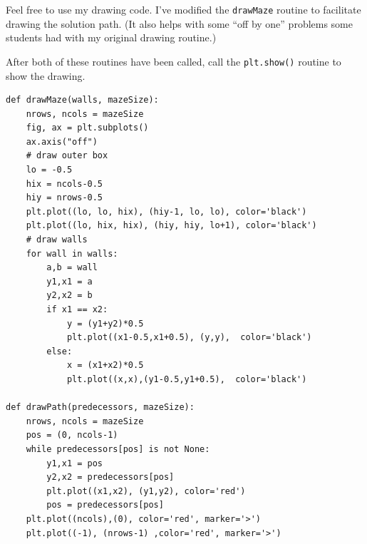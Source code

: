 \documentclass{article}
\begin{document}
\begin{description}
Feel free to use my drawing code.  I've modified the {\tt drawMaze}
routine to facilitate drawing the solution path.  (It also helps with
some ``off by one'' problems some students had with my original
drawing routine.)  

After both of these routines have been called, call the {\tt plt.show()}
routine to show the drawing.

\begin{lstlisting}
def drawMaze(walls, mazeSize):
    nrows, ncols = mazeSize
    fig, ax = plt.subplots()
    ax.axis("off")
    # draw outer box
    lo = -0.5
    hix = ncols-0.5
    hiy = nrows-0.5
    plt.plot((lo, lo, hix), (hiy-1, lo, lo), color='black')
    plt.plot((lo, hix, hix), (hiy, hiy, lo+1), color='black')
    # draw walls
    for wall in walls:
        a,b = wall
        y1,x1 = a
        y2,x2 = b
        if x1 == x2:
            y = (y1+y2)*0.5
            plt.plot((x1-0.5,x1+0.5), (y,y),  color='black')
        else:
            x = (x1+x2)*0.5
            plt.plot((x,x),(y1-0.5,y1+0.5),  color='black')
            
def drawPath(predecessors, mazeSize):
    nrows, ncols = mazeSize
    pos = (0, ncols-1)
    while predecessors[pos] is not None:
        y1,x1 = pos
        y2,x2 = predecessors[pos]
        plt.plot((x1,x2), (y1,y2), color='red')
        pos = predecessors[pos]
    plt.plot((ncols),(0), color='red', marker='>')
    plt.plot((-1), (nrows-1) ,color='red', marker='>')
\end{lstlisting}

\end{description}
\end{document}

